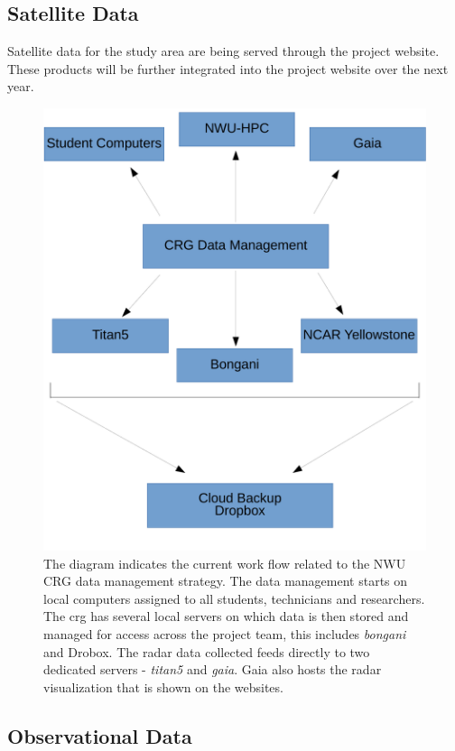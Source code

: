 \documentclass{wrcreport}
\begin{document}
\subsection{Satellite Data} Satellite data for the study area are being
served through the project website. These products will be further
integrated into the project website over the next year.

\begin{figure}
\includegraphics[width=\textwidth]{ComputerSolutions.pdf}
\caption[NWU CRG Data Management Setup]{The diagram indicates the
current work flow related to the NWU CRG data management strategy. The
data management starts on local computers assigned to all students,
technicians and researchers. The \gls{crg} has several local servers
on which data is then stored and managed for access across the project
team, this includes \textit{bongani} and Drobox. The radar data
collected feeds directly to two dedicated servers - \textit{titan5}
and \textit{gaia}. Gaia also hosts the radar visualization that is
shown on the websites.}
\label{fig:data_workflow}
\end{figure}

\subsection{Observational Data}
\end{document}
